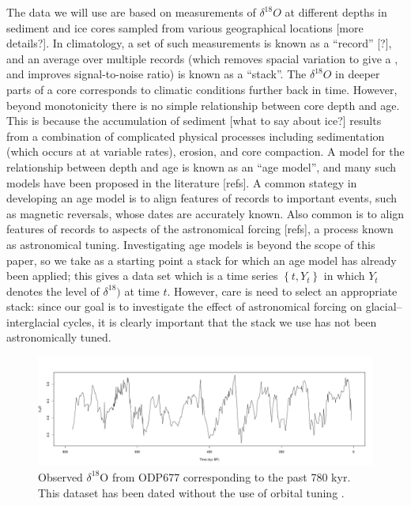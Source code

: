 \documentclass[a4paper,12pt]{article}
\begin{document}
The data we will use are based on measurements of $\delta^{18}O$ at different depths in sediment
and ice cores sampled from various geographical locations [more details?].  In
climatology, a set of such measurements is known as a ``record'' [?], and an average
over multiple records (which removes spacial variation to give a , and improves
signal-to-noise ratio) is known as a ``stack''.  The $\delta^{18}O$ in deeper parts of a
core corresponds to climatic conditions further back in time.  However, beyond monotonicity
there is no simple relationship between core depth and age.  This is because the
accumulation of sediment [what to say about ice?] results from a combination of 
complicated physical processes
including sedimentation (which occurs at at variable rates), erosion, and core
compaction.  A model for the relationship between depth and age is known as an ``age
model'', and many such models have been proposed in the literature [refs].  
A common stategy in developing an age
model is to align features of records to important events, such as magnetic reversals,
whose dates are accurately known.  Also common is to align features of records to aspects of the
astronomical forcing [refs], a process known as astronomical tuning.  Investigating age 
models is beyond the scope of this paper, so we take as a starting point a stack for which
an age model has already been applied; this gives a data set which is a time series 
$\left\{ t, Y_t\right\}$ in which $Y_t$ denotes the level of $\delta^{18})$ at time $t$.  
However, care is need to select an appropriate stack: since our goal is to investigate the 
effect of astronomical forcing on
glacial--interglacial cycles, it is clearly important that the stack we use has
not been astronomically tuned.

\begin{figure}[t]
\centering
\includegraphics[width=\textwidth]{ODP677Plot.pdf}
\caption{Observed $\delta^{18}\mbox{O}$ from ODP677 \cite{Shackleton1990} corresponding to the past 780 kyr.
This dataset has been dated without the use of orbital tuning  \cite{Huybers2007}.}
\label{Fig:Data}
\end{figure}
\end{document}
